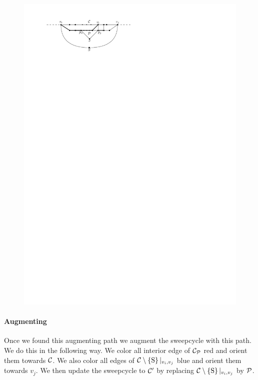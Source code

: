     \begin{figure}[h]
      \centering
      \includegraphics[scale=1]{unifiedAlgo/img/sweep/free2chord}
      \caption{}
      \label{fig:sweep:free2chord}
    \end{figure}

    \paragraph{Augmenting}
      Once we found this augmenting path we augment the sweepcycle with this path. We do this in the following way. We color all interior edge of $\C_\P$ red and orient them towards $\C$. We also color all edges of $\cpath|_{v_i,v_j}$  blue and orient them towards $v_j$. We then update the sweepcycle to $\C'$ by replacing $\cpath|_{v_i,v_j}$ by $\P$.


